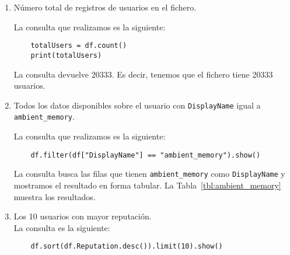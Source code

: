 \documentclass[12pt,a4paper,twoside,openright,titlepage,final]{article}
\begin{document}
\begin{enumerate}
	\item Número total de registros de usuarios en el fichero.
	
	La consulta que realizamos es la siguiente:
	
	\begin{verbatim}
	totalUsers = df.count()
	print(totalUsers)
	\end{verbatim}
	
	La consulta devuelve 20333. Es decir, tenemos que el fichero tiene 20333 usuarios.
	
	\item Todos los datos disponibles sobre el usuario con \texttt{DisplayName} igual a \texttt{ambient\_memory}.
	
	La consulta que realizamos es la siguiente:
	
	\begin{verbatim}
	df.filter(df["DisplayName"] == "ambient_memory").show()
	\end{verbatim}
	
	La consulta busca las filas que tienen \texttt{ambient\_memory} como \texttt{DisplayName} y mostramos el resultado en forma tabular. La Tabla~\ref{tbl:ambient_memory} muestra los resultados.
	
	\begin{table}[htbp!]
		\centering
		\caption{Información del usuario \texttt{ambient\_memory}}
		\label{tbl:ambient_memory}
	\end{table}
	
	\item Los 10 usuarios con mayor reputación.\\
	
	La consulta es la siguiente:
	
	\begin{verbatim}
	df.sort(df.Reputation.desc()).limit(10).show()
	

\end{verbatim}
\end{enumerate}
\end{document}
